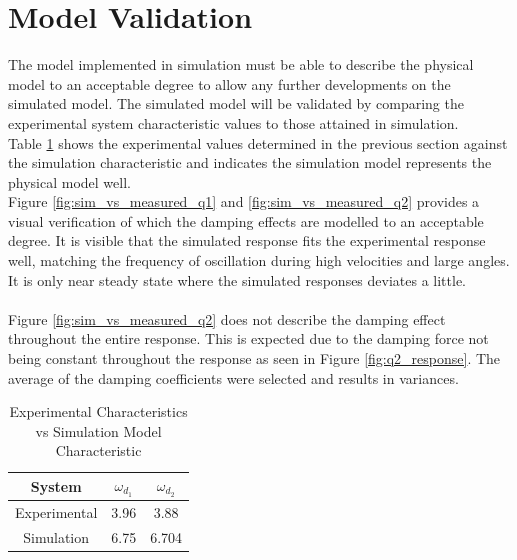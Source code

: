 \section{Model Validation}
The model implemented in simulation must be able to describe the physical model to an acceptable degree to allow any further developments on the simulated model. The simulated model will be validated by comparing the experimental system characteristic values to those attained in simulation.\\

Table \ref{table:experiment_vs_simulation} shows the experimental values determined in the previous section against the simulation characteristic and indicates the simulation model represents the physical model well.\\

Figure \ref{fig:sim_vs_measured_q1} and \ref{fig:sim_vs_measured_q2} provides a visual verification of which the damping effects are modelled to an acceptable degree. It is visible that the simulated response fits the experimental response well, matching the frequency of oscillation during high velocities and large angles. It is only near steady state where the simulated responses deviates a little. \\\\

Figure \ref{fig:sim_vs_measured_q2} does not describe the damping effect throughout the entire response. This is expected due to the damping force not being constant throughout the response as seen in Figure \ref{fig:q2_response}. The average of the damping coefficients were selected and results in variances.


\begin{table}[]
	\centering
	\begin{tabular}{|c|c|c|}
		\hline
		System & $\omega_{d_{1}}$  & $\omega_{d_{2}}$ \\
		\hline
		\hline
		Experimental  & 3.96 &  3.88\\
		\hline
		Simulation & 6.75 & 6.704\\ 
		\hline
	\end{tabular}
	\caption{Experimental Characteristics vs Simulation Model Characteristic}
	\label{table:experiment_vs_simulation}
\end{table}

